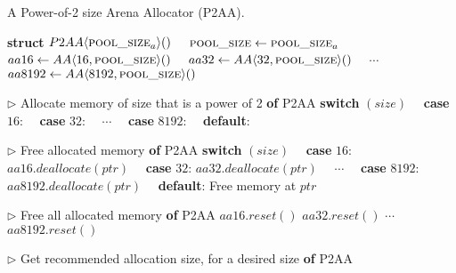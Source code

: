 \begin{algorithm}[hbtp]
\caption{A Power-of-2 size Arena Allocator (P2AA).}
\label{alg:p2aa}
\begin{algorithmic}[1]

\Statex

\State \textbf{struct} $P2AA \langle \textsc{pool\_size}_a \rangle ()$
\State \ \ $\textsc{pool\_size} \gets \textsc{pool\_size}_a$  \label{alg:p2aa--init-const}
\State \ \ $aa16 \gets AA \langle 16, \textsc{pool\_size} \rangle ()$  \label{alg:p2aa--init-begin}
\State \ \ $aa32 \gets AA \langle 32, \textsc{pool\_size} \rangle ()$ 
\State \ \ $\cdots$ 
\State \ \ $aa8192 \gets AA \langle 8192, \textsc{pool\_size} \rangle ()$  \label{alg:p2aa--init-end}

\Statex

\State $\rhd$ Allocate memory of size that is a power of 2
 \textbf{of} P2AA
  \State \textbf{switch} $(size)$
  \State \ \ \textbf{case} $16$:  \label{alg:p2aa--allocate-pow2-begin}
  \State \ \ \textbf{case} $32$: 
  \State \ \ $\cdots$
  \State \ \ \textbf{case} $8192$:  \label{alg:p2aa--allocate-pow2-end}
  \State \ \ \textbf{default}:  \label{alg:p2aa--allocate-other}
\EndFunction

\Statex

\State $\rhd$ Free allocated memory
 \textbf{of} P2AA
  \State \textbf{switch} $(size)$
  \State \ \ \textbf{case} $16$: $aa16.deallocate(ptr)$ \label{alg:p2aa--deallocate-pow2-begin}
  \State \ \ \textbf{case} $32$: $aa32.deallocate(ptr)$
  \State \ \ $\cdots$
  \State \ \ \textbf{case} $8192$: $aa8192.deallocate(ptr)$ \label{alg:p2aa--deallocate-pow2-end}
  \State \ \ \textbf{default}: Free memory at $ptr$ \label{alg:p2aa--deallocate-other}
\EndFunction

\Statex

\State $\rhd$ Free all allocated memory
 \textbf{of} P2AA
  \State $aa16.reset()$ \label{alg:p2aa--reset-begin}
  \State $aa32.reset()$
  \State $\cdots$
  \State $aa8192.reset()$ \label{alg:p2aa--reset-end}
\EndFunction

\Statex

\State $\rhd$ Get recommended allocation size, for a desired size
 \textbf{of} P2AA
    \label{alg:p2aa--allocationsize-16}
    \label{alg:p2aa--allocationsize-8192}
  \Else\  \label{alg:p2aa--allocationsize-other}
  \EndIf
\EndFunction
\end{algorithmic}
\end{algorithm}
